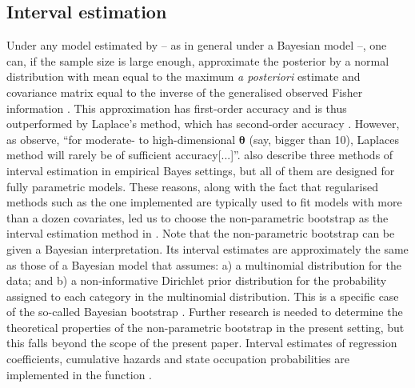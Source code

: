 \subsection{Interval estimation}
\label{sec:interval_estimation}

Under any model estimated by  -- as in general under a Bayesian model --,  one can, if the sample size is large enough, approximate the posterior by a normal distribution with mean equal to the maximum \textit{a posteriori} estimate and covariance matrix equal to the inverse of the generalised observed Fisher information \citep[see, for example,][p. 83-84]{Gelman2014}. This approximation has first-order accuracy and is thus outperformed by Laplace's method, which has second-order accuracy \citep[][p. 110-111]{Carlin2009}. However, as \citet[p. 112]{Carlin2009} observe, ``for moderate- to high-dimensional $\boldsymbol\theta$ (say, bigger than 10), Laplace\textquotesingle s method will rarely be of sufficient accuracy[...]''. 
\citet[][p. 244-251]{Carlin2009} also describe three methods of interval estimation in empirical Bayes settings, but all of them are designed for fully parametric models. These reasons, along with the fact that regularised methods such as the one implemented   are typically  used to fit models with more than a dozen covariates, led us to choose the non-parametric bootstrap as the interval estimation method in . Note that the non-parametric bootstrap can be given a Bayesian interpretation. Its interval estimates are approximately the same as those of a Bayesian model that assumes: a) a multinomial distribution for the data; and b) a non-informative Dirichlet prior distribution for the probability assigned to each category in the multinomial distribution. This is a specific case of the so-called Bayesian bootstrap \citep[][p. 272]{Hastie2009}. Further research is needed to determine the theoretical properties of the non-parametric bootstrap in the present setting, but this falls beyond the scope of the present paper. Interval estimates of regression coefficients, cumulative hazards and state occupation probabilities are implemented in the function .


